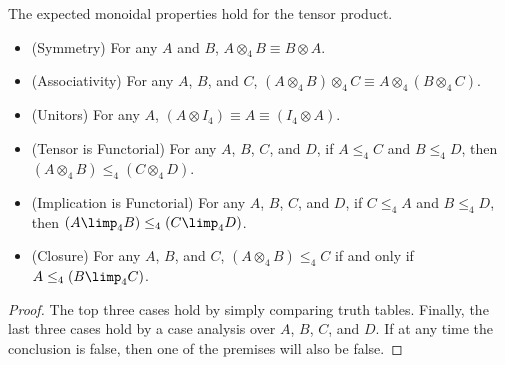 The expected monoidal properties hold for the tensor product.
\begin{lemma}
  \label{lemma:tensor_is_symmetric_monoidal_closed}
  \begin{itemize}
  \item[] (Symmetry) For any $A$ and $B$, $A \otimes_4 B \equiv B \otimes A$.\\
  \item[] (Associativity) For any $A$, $B$, and $C$, $(A \otimes_4 B) \otimes_4 C \equiv A \otimes_4 (B \otimes_4 C)$.\\
  \item[] (Unitors) For any $A$, $(A \otimes I_4) \equiv A \equiv (I_4 \otimes A)$.\\
  \item[] (Tensor is Functorial) For any $A$, $B$, $C$, and $D$, if $A \leq_4 C$ and $B \le_4 D$, then
    $(A \otimes_4 B) \leq_4 (C \otimes_4 D)$.\\
  \item[] (Implication is Functorial) For any $A$, $B$, $C$, and $D$, if
    $C \leq_4 A$ and $B \leq_4 D$, then $(A \limp_4 B) \leq_4 (C
    \limp_4 D)$.\\
  \item[] (Closure) For any $A$, $B$, and $C$, $(A \otimes_4 B) \leq_4 C$ if and only if $A \leq_4 (B \limp_4 C)$.
  \end{itemize}
\end{lemma}
\begin{proof}
  The top three cases hold by simply comparing truth tables. Finally,
  the last three cases hold by a case analysis over $A$, $B$, $C$, and
  $D$.  If at any time the conclusion is false, then one of the
  premises will also be false.
\end{proof}

